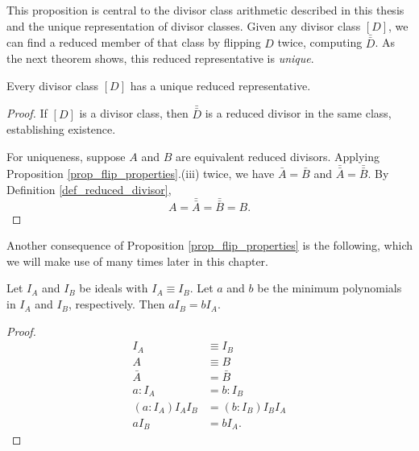 This proposition is central to the divisor class arithmetic described in this thesis
and the unique representation of divisor classes.
Given any divisor class $[D]$, we can find a reduced member of that class by
flipping $D$ twice, computing $\bar{\bar D}$. As the next theorem shows,
this reduced representative is \emph{unique}.

\begin{theorem}
  Every divisor class $[D]$ has a unique reduced representative.
\end{theorem}
\begin{proof}
  If $[D]$ is a divisor class, then $\bar{\bar D}$ is a reduced divisor in the same class,
  establishing existence.
  
  For uniqueness, suppose $A$ and $B$ are equivalent reduced divisors.
  Applying Proposition \ref{prop_flip_properties}.(iii) twice,
  we have $\bar A = \bar B$ and $\bar{\bar A} = \bar{\bar B}$.
  By Definition \ref{def_reduced_divisor},
    \[ A = \bar{\bar A} = \bar{\bar B} = B. \]
\end{proof}

Another consequence of Proposition \ref{prop_flip_properties} is the following,
which we will make use of many times later in this chapter.
\begin{proposition}
  \label{prop_aI_B_is_bI_A}
  Let $I_A$ and $I_B$ be ideals with $I_A \equiv I_B$.
  Let $a$ and $b$ be the minimum polynomials in $I_A$ and $I_B$, respectively.
  Then $aI_B = bI_A$.
\end{proposition}
\begin{proof}
  \begin{align*}
    I_A &\equiv I_B \\
    A &\equiv B \\
    \bar A &= \bar B \\
    a : I_A &= b : I_B \\
    (a : I_A)I_AI_B &= (b : I_B)I_BI_A \\
    aI_B &= bI_A.
  \end{align*}
\end{proof}

